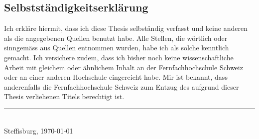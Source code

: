 \begin{appendix}
\chapter*{Selbstständigkeitserklärung}
Ich erkläre hiermit, dass ich diese Thesis selbständig verfasst 
und keine anderen als die angegebenen Quellen benutzt habe. 
Alle Stellen, die wörtlich oder sinngemäss aus Quellen entnommen wurden, 
habe ich als solche kenntlich gemacht. Ich versichere zudem, dass ich bisher 
noch keine wissenschaftliche Arbeit mit gleichem oder ähnlichem Inhalt an der 
Fernfachhochschule Schweiz oder an einer anderen Hochschule eingereicht habe. 
Mir ist bekannt, dass anderenfalls die Fernfachhochschule Schweiz zum Entzug 
des aufgrund dieser Thesis verliehenen Titels berechtigt ist.

\vspace{3cm}
\noindent
\hrule \ \\[-0.5ex]
Steffisburg, \today
\end{appendix}